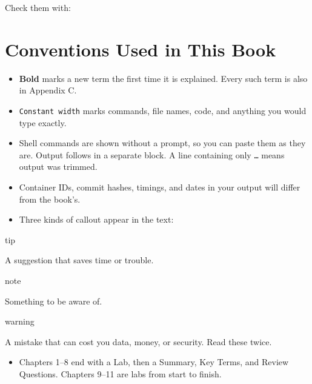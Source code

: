 
Check them with:

\begin{codeblock}

\begin{Shaded}
\begin{Highlighting}[]
 
 
 
\end{Highlighting}
\end{Shaded}

\end{codeblock}

\section{Conventions Used in This Book}\label{00-preface:conventions-used-in-this-book}

\begin{itemize}
\tightlist
\item
  \textbf{Bold} marks a new term the first time it is explained. Every such term is also in Appendix C.
\item
  \texttt{Constant\ width} marks commands, file names, code, and anything you would type exactly.
\item
  Shell commands are shown without a prompt, so you can paste them as they are. Output follows in a separate block. A line containing only \texttt{…} means output was trimmed.
\item
  Container IDs, commit hashes, timings, and dates in your output will differ from the book's.
\item
  Three kinds of callout appear in the text:
\end{itemize}

\begin{callout}{tip}

A suggestion that saves time or trouble.

\end{callout}

\begin{callout}{note}

Something to be aware of.

\end{callout}

\begin{callout}{warning}

A mistake that can cost you data, money, or security. Read these twice.

\end{callout}

\begin{itemize}
\tightlist
\item
  Chapters 1--8 end with a Lab, then a Summary, Key Terms, and Review Questions. Chapters 9--11 are labs from start to finish.
\end{itemize}

